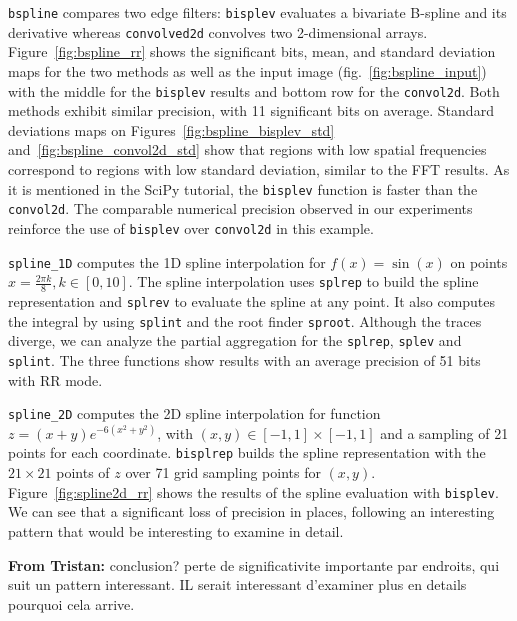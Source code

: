 \documentclass[11pt]{article}
\newcommand{\tristan}[1]{\color{orange}\textbf{From Tristan:} #1\color{black}\xspace}
\begin{document}
\texttt{bspline} compares two edge filters: \texttt{bisplev} evaluates a bivariate B-spline and its derivative whereas \texttt{convolved2d} convolves two 2-dimensional arrays. Figure~\ref{fig:bspline_rr}
shows the significant bits, mean, and standard deviation 
maps for the two methods as well as the input image (fig.~\ref{fig:bspline_input}) with the middle for the \texttt{bisplev} results and bottom row for the \texttt{convol2d}. Both methods exhibit similar precision, with 11 significant bits on average. Standard deviations maps on Figures~\ref{fig:bspline_bisplev_std} and~\ref{fig:bspline_convol2d_std} show that regions with low spatial frequencies correspond to regions with low standard deviation, similar to the FFT results. As it is mentioned in the SciPy tutorial, the \texttt{bisplev} function is faster than the \texttt{convol2d}. The comparable numerical precision observed in our experiments reinforce the use of \texttt{bisplev} over \texttt{convol2d} in this example.

\texttt{spline\_1D} computes the 1D spline interpolation for $f(x)=\sin(x)$ on points $x=\frac{2\pi k}{8}, k \in [0, 10]$. The spline interpolation uses \texttt{splrep} to build the spline representation and \texttt{splrev} to evaluate the spline at any point. It also computes the integral by using \texttt{splint} and the root finder \texttt{sproot}. Although the traces diverge, we can analyze the partial aggregation for the \texttt{splrep}, \texttt{splev} and \texttt{splint}. The three functions show results with an average precision of 51 bits with RR mode.
 
\texttt{spline\_2D} computes the 2D spline interpolation for function $z=(x+y)e^{-6(x^2+y^2)}$, with $(x,y) \in [-1,1]\times[-1,1]$ and a sampling of 21 points for each coordinate. \texttt{bisplrep} builds the spline representation with the $21 \times 21$ points of $z$ over 71 grid sampling points for $(x,y)$. Figure~\ref{fig:spline2d_rr} shows the results of the spline evaluation with \texttt{bisplev}. We can see that a significant loss of precision in places, following 
an interesting pattern that would be interesting to examine in detail. 

\tristan{conclusion? perte de significativite importante par endroits, qui suit un pattern interessant. IL serait interessant d'examiner plus en details pourquoi cela arrive.} 


\end{document}
